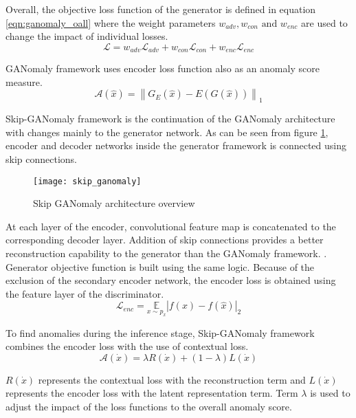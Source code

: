 Overall, the objective loss function of the generator is defined in equation
\ref{eqn:ganomaly_oall} where the weight parameters $w_{adv}, w_{con} \text { and } w_{enc}$
are used to change the impact of individual losses.
\begin{equation}
    \label{eqn:ganomaly_oall}
    \mathcal{L}=w_{a d v} \mathcal{L}_{a d v}+w_{c o n} \mathcal{L}_{c o n}+w_{e n c} \mathcal{L}_{e n c} 
\end{equation}

GANomaly framework uses encoder loss function also as an anomaly score measure.  
\begin{equation}
\label{eqn:ganomaly_as}
    \mathcal{A}(\hat{x})=\left\|G_{E}(\hat{x})-E(G(\hat{x}))\right\|_{1}  
\end{equation}

Skip-GANomaly framework\cite{Akay2019SkipGANomalySC} is the continuation of the GANomaly architecture with changes mainly to the
generator network. As can be seen from figure \ref{fig:sganomaly_model}, encoder and decoder
networks inside the generator framework is connected using skip connections. 
\begin{figure}[h!]
	\centering
	\texttt{[image: skip\_ganomaly]}
    \caption{Skip GANomaly architecture overview \cite{Akay2019SkipGANomalySC}}
    \label{fig:sganomaly_model}
\end{figure}

At each layer of the encoder, convolutional feature map is concatenated to the corresponding decoder
layer. Addition of skip connections provides a better reconstruction capability to the generator
than the GANomaly framework. \cite{Akay2018GANomalySA}. Generator objective function is built using
the same logic. Because of the exclusion of the secondary encoder network, the encoder loss is
obtained using the feature layer of the discriminator. 
\begin{equation}
    \mathcal{L}_{enc}=\underset{x \sim p_{x}}{\mathbb{E}}|f(x)-f(\hat{x})|_{2}  
\end{equation}

To find anomalies during the inference stage, Skip-GANomaly framework combines the encoder loss with
the use of contextual loss. 
\begin{equation}
	\label{eqn:sganomaly_as}
    \mathcal{A}(\dot{x})=\lambda R(\dot{x})+(1-\lambda) L(\dot{x})  
\end{equation}

$R(\dot{x})$ represents the contextual loss with the reconstruction term and $L(\dot{x})$ represents
the encoder loss with the latent representation term. Term $\lambda$ is used to adjust the impact of
the loss functions to the overall anomaly score.


